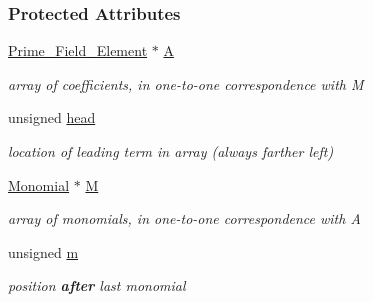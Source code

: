 \subsubsection*{Protected Attributes}
\begin{DoxyCompactItemize}
\item 
\mbox{\label{group__polygroup_a0b78eef8746e334e8db176d479e734b9}} 
\hyperlink{group___fields_group_class_prime___field___element}{Prime\+\_\+\+Field\+\_\+\+Element} $\ast$ \hyperlink{group__polygroup_a0b78eef8746e334e8db176d479e734b9}{A}
\begin{DoxyCompactList}\small\item\em array of coefficients, in one-\/to-\/one correspondence with {\ttfamily M} \end{DoxyCompactList}\item 
\mbox{\label{group__polygroup_ab82cd79a8965d04717a0c82ae79ff4b4}} 
unsigned \hyperlink{group__polygroup_ab82cd79a8965d04717a0c82ae79ff4b4}{head}
\begin{DoxyCompactList}\small\item\em location of leading term in array (always farther left) \end{DoxyCompactList}\item 
\mbox{\label{group__polygroup_aec23722090ac440cee1be3cb54ed5d16}} 
\hyperlink{group__polygroup_class_monomial}{Monomial} $\ast$ \hyperlink{group__polygroup_aec23722090ac440cee1be3cb54ed5d16}{M}
\begin{DoxyCompactList}\small\item\em array of monomials, in one-\/to-\/one correspondence with {\ttfamily A} \end{DoxyCompactList}\item 
\mbox{\label{group__polygroup_acbd3e3d53eefdfae5b59431d40ccd11b}} 
unsigned \hyperlink{group__polygroup_acbd3e3d53eefdfae5b59431d40ccd11b}{m}
\begin{DoxyCompactList}\small\item\em position {\bfseries after} last monomial \end{DoxyCompactList}\end{DoxyCompactItemize}
